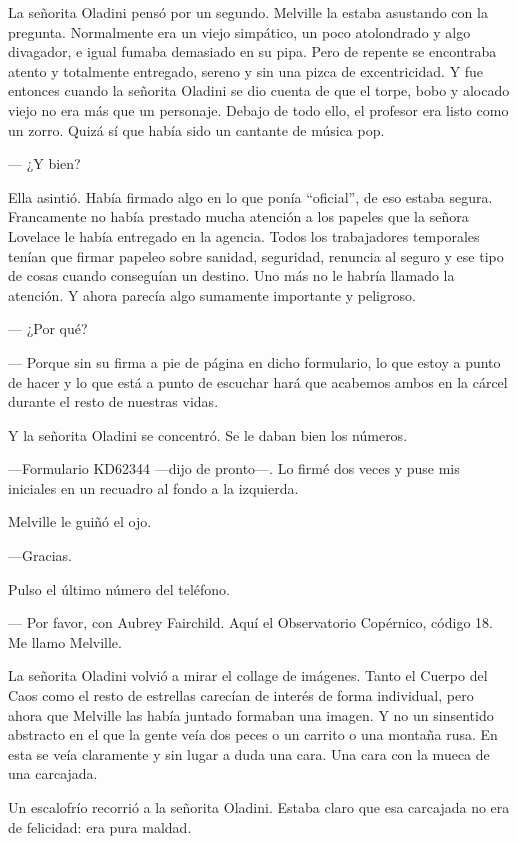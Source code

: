 La señorita Oladini pensó por un segundo. Melville la estaba asustando
con la pregunta. Normalmente era un viejo simpático, un poco atolondrado
y algo divagador, e igual fumaba demasiado en su pipa. Pero de repente
se encontraba atento y totalmente entregado, sereno y sin una pizca de
excentricidad. Y fue entonces cuando la señorita Oladini se dio cuenta
de que el torpe, bobo y alocado viejo no era más que un personaje.
Debajo de todo ello, el profesor era listo como un zorro. Quizá sí que
había sido un cantante de música pop.

--- ¿Y bien?

Ella asintió. Había firmado algo en lo que ponía ``oficial'', de eso
estaba segura. Francamente no había prestado mucha atención a los
papeles que la señora Lovelace le había entregado en la agencia. Todos
los trabajadores temporales tenían que firmar papeleo sobre sanidad,
seguridad, renuncia al seguro y ese tipo de cosas cuando conseguían un
destino. Uno más no le habría llamado la atención. Y ahora parecía algo
sumamente importante y peligroso.

--- ¿Por qué?

--- Porque sin su firma a pie de página en dicho formulario, lo que
estoy a punto de hacer y lo que está a punto de escuchar hará que
acabemos ambos en la cárcel durante el resto de nuestras vidas.

Y la señorita Oladini se concentró. Se le daban bien los números.

---Formulario KD62344 ---dijo de pronto---. Lo firmé dos veces y puse
mis iniciales en un recuadro al fondo a la izquierda.

Melville le guiñó el ojo.

---Gracias.

Pulso el último número del teléfono.

---  Por favor, con Aubrey Fairchild. Aquí el Observatorio Copérnico,
código 18. Me llamo Melville.

La señorita Oladini volvió a mirar el collage de imágenes. Tanto el
Cuerpo del Caos como el resto de estrellas carecían de interés de forma
individual, pero ahora que Melville las había juntado formaban una
imagen. Y no un sinsentido abstracto en el que la gente veía dos peces o
un carrito o una montaña rusa. En esta se veía claramente y sin lugar a
duda una cara. Una cara con la mueca de una carcajada.

Un escalofrío recorrió a la señorita Oladini. Estaba claro que esa
carcajada no era de felicidad: era pura maldad.

